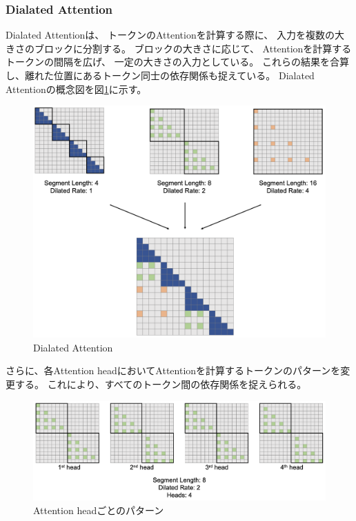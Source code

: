 \documentclass{jsarticle}
\begin{document}
        \subsubsection{Dialated Attention}
            Dialated Attentionは、
            トークンのAttentionを計算する際に、
            入力を複数の大きさのブロックに分割する。
            ブロックの大きさに応じて、
            Attentionを計算するトークンの間隔を広げ、
            一定の大きさの入力としている。
            これらの結果を合算し、離れた位置にあるトークン同士の依存関係も捉えている。
            Dialated Attentionの概念図を図\ref{fig:dialated}に示す。
            \begin{figure}[ht]
                \centering
                \includegraphics[width=\hsize]{dialated.png}
                \caption{Dialated Attention\cite{longnet}}
                \label{fig:dialated}
            \end{figure}
            
            さらに、各Attention headにおいてAttentionを計算するトークンのパターンを変更する。
            これにより、すべてのトークン間の依存関係を捉えられる。
            \begin{figure}[ht]
                \centering
                \includegraphics[width=\hsize]{dialated_pattern.png}
                \caption{Attention headごとのパターン\cite{longnet}}
            \end{figure}
\end{document}
